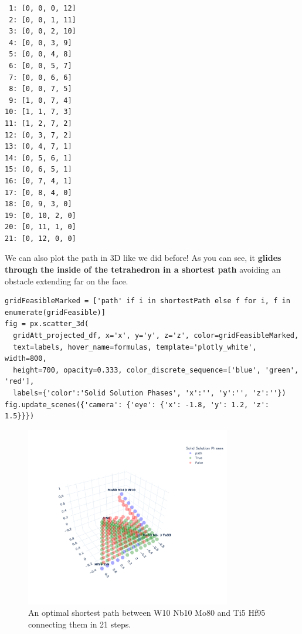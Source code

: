 \begin{verbatim}
 1: [0, 0, 0, 12]
 2: [0, 0, 1, 11]
 3: [0, 0, 2, 10]
 4: [0, 0, 3, 9]
 5: [0, 0, 4, 8]
 6: [0, 0, 5, 7]
 7: [0, 0, 6, 6]
 8: [0, 0, 7, 5]
 9: [1, 0, 7, 4]
10: [1, 1, 7, 3]
11: [1, 2, 7, 2]
12: [0, 3, 7, 2]
13: [0, 4, 7, 1]
14: [0, 5, 6, 1]
15: [0, 6, 5, 1]
16: [0, 7, 4, 1]
17: [0, 8, 4, 0]
18: [0, 9, 3, 0]
19: [0, 10, 2, 0]
20: [0, 11, 1, 0]
21: [0, 12, 0, 0]
\end{verbatim}

We can also plot the path in 3D like we did before! As you can see, it
\textbf{glides through the inside of the tetrahedron in a shortest path}
avoiding an obstacle extending far on the face.

\begin{verbatim}
gridFeasibleMarked = ['path' if i in shortestPath else f for i, f in enumerate(gridFeasible)]
fig = px.scatter_3d(
  gridAtt_projected_df, x='x', y='y', z='z', color=gridFeasibleMarked, 
  text=labels, hover_name=formulas, template='plotly_white', width=800, 
  height=700, opacity=0.333, color_discrete_sequence=['blue', 'green', 'red'],
  labels={'color':'Solid Solution Phases', 'x':'', 'y':'', 'z':''})
fig.update_scenes({'camera': {'eye': {'x': -1.8, 'y': 1.2, 'z': 1.5}}})
\end{verbatim}

\begin{figure}[H]
    \centering
    \includegraphics[width=0.8\textwidth]{nimplextutorial2/02.AdditiveManufacturingPathPlanning_58_1.pdf}
    \caption{An optimal shortest path between W10 Nb10 Mo80 and Ti5 Hf95 connecting them in 21 steps.}
    \label{nimplextutorial2:fig:shortest}
\end{figure}


